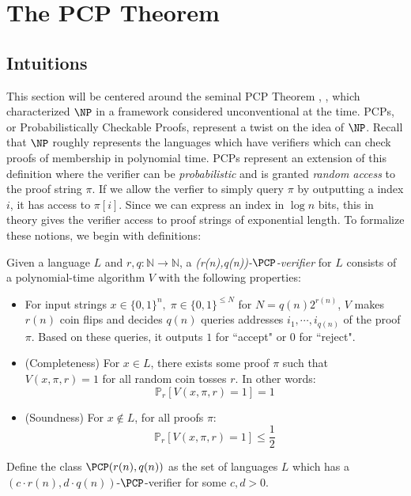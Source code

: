 \section{The PCP Theorem}
\subsection{Intuitions}
This section will be centered around the seminal PCP Theorem \cite{arora1998proof}, \cite{arora1998probabilistic}, which characterized $\NP$ in a framework considered unconventional at the time. PCPs, or Probabilistically Checkable Proofs, represent a twist on the idea of $\NP$. Recall that $\NP$ roughly represents the languages which have verifiers which can check proofs of membership in polynomial time. PCPs represent an extension of this definition where the verifier can be \emph{probabilistic} and is granted \emph{random access} to the proof string $\pi$. If we allow the verfier to simply query $\pi$ by outputting a index $i$, it has access to $\pi[i]$. Since we can express an index in $\log{n}$ bits, this in theory gives the verifier access to proof strings of exponential length. To formalize these notions, we begin with definitions:

\begin{definition}
  Given a language $L$ and $r,q: \mathbb{N} \rightarrow \mathbb{N}$, a \emph{(r(n),q(n))-$\PCP$-verifier} for $L$ consists of a polynomial-time algorithm $V$ with the following properties: \newline

  \begin{itemize}
    \item For input strings $x \in \{0,1\}^n, \; \pi \in \{0,1\}^{\leq N}$ for $N = q(n)2^{r(n)}$, $V$ makes $r(n)$ coin flips and decides $q(n)$ queries addresses $i_1, \cdots, i_{q(n)}$ of the proof $\pi$. Based on these queries, it outputs $1$ for ``accept" or $0$ for ``reject". \newline

    \item (Completeness) For $x \in L$, there exists some proof $\pi$ such that $V(x,\pi,r) = 1$ for all random coin tosses $r$. In other words:
    \begin{equation}
      \mathbb{P}_{r}[V(x,\pi,r) = 1] = 1
    \end{equation}

    \item (Soundness) For $x \not\in L$, for all proofs $\pi$:
    \begin{equation}
      \mathbb{P}_{r}[V(x,\pi,r) = 1] \leq \frac{1}{2}
    \end{equation}
  \end{itemize}
  Define the class $\PCP(r(n),q(n))$ as the set of languages $L$ which has a $(c\cdot r(n),d\cdot q(n))$-$\PCP$-verifier for some $c,d > 0$.
\end{definition}

